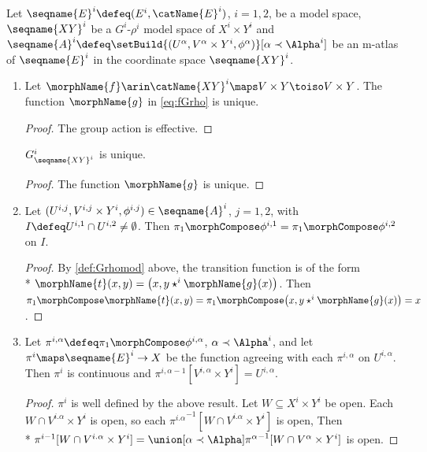 \documentclass{article}
\begin{document}
\begin{lemma}
\label{lem:Grhomod}
Let $\seqname{E}^i \defeq (E^i, \catName{E}^i)$, $i=1,2$, be a model
space, $\seqname{XY}^i$ be a $G^i$-$\rho^i$ model space of
$X^i \times Y^i$ and
$
  \seqname{A}^i \defeq
  \setBuild%
    {{(U^\alpha, V^\alpha \times Y^i, \phi^\alpha)}}%
    [{\alpha \prec \Alpha^i}]
$
be an m-atlas of $\seqname{E}^i$ in the coordinate space $\seqname{XY}^i$.
\begin{enumerate}
\item
Let $\morphName{f} \arin \catName{XY}^i \maps V \times Y \toiso V \times Y$.
The function $\morphName{g}$ in \cref{eq:fGrho} is unique.

\begin{proof}
The group action is effective.
\end{proof}

$G^i_{\seqname{XY}^i}$ is unique.

\begin{proof}
The function $\morphName{g}$ is unique.
\end{proof}

\item
Let $(U^{i,j}, V^{i,j} \times Y^i, \phi^{i.j}) \in \seqname{A}^i$,
$j=1,2$, with $I \defeq U^{i,1} \cap U^{i,2} \neq \emptyset$. Then
$\pi_1 \morphCompose \phi^{i,1} = \pi_1 \morphCompose \phi^{i,2}$ on $I$.

\begin{proof}
By \cref{def:Grhomod} above, the transition function is of the form \\*
$\morphName{t}(x,y) = \bigl ( x, y \star^i \morphName{g}(x) \bigr )$.
Then
$
  \pi_1 \morphCompose \morphName{t}(x,y) =
  \pi_1 \morphCompose \bigl ( x, y \star^i \morphName{g}(x) \bigr ) =
  x
$.
\end{proof}

\item
Let $\pi^{i,\alpha} \defeq \pi_1 \morphCompose \phi^{i,\alpha}$,
$\alpha \prec \Alpha^i$, and let $\pi^i \maps \seqname{E}^i \to X$ be
the function agreeing with each $\pi^{i,\alpha}$ on $U^{i,\alpha}$. Then
$\pi^i$ is continuous and
$\pi^{{i,\alpha}-1}[V^{i,\alpha} \times Y^i] = U^{i,\alpha}$.

\begin{proof}
$\pi^i$ is well defined by the above result. Let
$W \subseteq X^i \times Y^i$ be open. Each $W \cap V^{i.\alpha} \times Y^i$ is
open, so each ${\pi^{i.\alpha}}^{-1}[W \cap V^{i.\alpha} \times Y^i]$ is open,
Then \\*
$
  \pi^{i-1}[W \cap V^{i.\alpha} \times Y^i] =
  \union%
  [{{\alpha \prec \Alpha}}]%
  {{\pi^\alpha}^{-1}[W \cap V^\alpha \times Y^i]}
$
is open.
\end{proof}


\end{enumerate}
\end{lemma}
\end{document}
